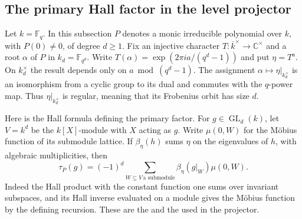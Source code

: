 \subsection{The primary Hall factor in the level projector}

Let $k=\mathbb F_q$. In this subsection $P$ denotes a monic irreducible
polynomial over $k$, with $P(0)\ne0$, of degree $d\ge1$.
Fix an injective character $T:\overline{k}^{\times}\to\mathbb C^{\times}$
and a root $\alpha$ of $P$ in $k_d=\mathbb F_{q^d}$. Write
$T(\alpha)=\exp(2\pi i a/(q^d-1))$ and put $\eta=T^a$.
On $k_d^\times$ the result depends only on $a\bmod (q^d-1)$.
The assignment $\alpha\mapsto\eta|_{k_d^\times}$ is an isomorphism
from a cyclic group to its dual and commutes with the $q$-power map.
Thus $\eta|_{k_d^\times}$ is regular, meaning that its Frobenius orbit
has size $d$.

Here is the Hall formula defining the primary factor. For
$g\in\operatorname{GL}_d(k)$, let $V=k^d$ be the $k[X]$-module with
$X$ acting as $g$. Write $\mu(0,W)$ for the M\"obius function of its
submodule lattice. If $\beta_\eta(h)$ sums $\eta$ on the eigenvalues
of $h$, with algebraic multiplicities, then
\[
 \tau_P(g)=(-1)^d\sum_{W\subseteq V\,\text{a submodule}}
       \beta_\eta(g|_W)\mu(0,W).
\]
Indeed the Hall product with the constant function one sums over invariant
subspaces, and its Hall inverse evaluated on a module gives
the M\"obius function by the defining recursion. These are the
and the 
used in the projector.

